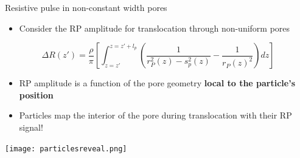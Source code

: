 
\begin{frame}[c]{Resistive pulse in non-constant width pores}
	\begin{itemize}
		\item Consider the RP amplitude for translocation through non-uniform pores
	\end{itemize}
	$$ \Delta R\left(z'\right)=\frac{\rho}{\pi}\left[\int_{z=z'}^{z=z'+l_{p}}\left(\frac{1}{r_{P}^{2}\left(z\right)-s_{p}^{2}\left(z\right)}-\frac{1}{r_{P}\left(z\right)^{2}}\right)dz\right] $$
	\begin{itemize}
		\item RP amplitude is a function of the pore geometry \textbf{local to the particle's position}
		\item Particles map the interior of the pore during translocation with their RP signal!
	\end{itemize}
	
	{\centering
		\texttt{[image: particlesreveal.png]} \\
		\par
	}

	
\end{frame}



